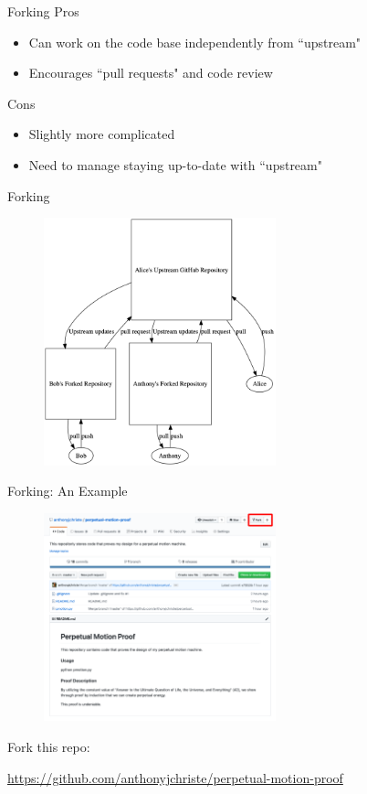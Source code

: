\documentclass{beamer}
\begin{document}
    \begin{frame}{Forking}
        Pros
        \begin{itemize}
            \item Can work on the code base independently from ``upstream"
            \item Encourages ``pull requests" and code review
        \end{itemize}

        Cons
        \begin{itemize}
            \item Slightly more complicated
            \item Need to manage staying up-to-date with ``upstream"
        \end{itemize}
    \end{frame}

    \begin{frame}{Forking}
        \begin{figure}
            \centering
            \includegraphics[width=0.6\textwidth]{figures/fork.png}
        \end{figure}
    \end{frame}

    \begin{frame}{Forking: An Example}
        \begin{figure}
            \centering
            \includegraphics[width=0.6\textwidth]{figures/fork_me.png}
        \end{figure}
        \centering
        Fork this repo:

        \url{https://github.com/anthonyjchriste/perpetual-motion-proof}
    \end{frame}
\end{document}

